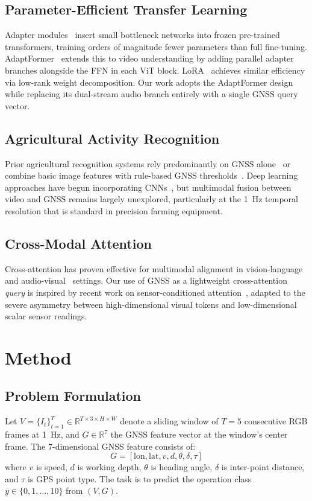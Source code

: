 \documentclass[10pt,twocolumn]{article}
\begin{document}
\subsection{Parameter-Efficient Transfer Learning}
Adapter modules~\cite{houlsby2019parameter} insert small bottleneck networks into frozen pre-trained transformers, training orders of magnitude fewer parameters than full fine-tuning. AdaptFormer~\cite{chen2022adaptformer} extends this to video understanding by adding parallel adapter branches alongside the FFN in each ViT block. LoRA~\cite{hu2021lora} achieves similar efficiency via low-rank weight decomposition. Our work adopts the AdaptFormer design while replacing its dual-stream audio branch entirely with a single GNSS query vector.

\subsection{Agricultural Activity Recognition}
Prior agricultural recognition systems rely predominantly on GNSS alone~\cite{zhang2010gnss} or combine basic image features with rule-based GNSS thresholds~\cite{strisciuglio2018detection}. Deep learning approaches have begun incorporating CNNs~\cite{koirala2019deep}, but multimodal fusion between video and GNSS remains largely unexplored, particularly at the 1~Hz temporal resolution that is standard in precision farming equipment.

\subsection{Cross-Modal Attention}
Cross-attention has proven effective for multimodal alignment in vision-language~\cite{radford2021clip} and audio-visual~\cite{morgado2021avid} settings. Our use of GNSS as a lightweight cross-attention \emph{query} is inspired by recent work on sensor-conditioned attention~\cite{liu2022bevfusion}, adapted to the severe asymmetry between high-dimensional visual tokens and low-dimensional scalar sensor readings.

\section{Method}

\subsection{Problem Formulation}
Let $V = \{I_t\}_{t=1}^{T} \in \mathbb{R}^{T \times 3 \times H \times W}$ denote a sliding window of $T=5$ consecutive RGB frames at 1~Hz, and $G \in \mathbb{R}^{7}$ the GNSS feature vector at the window's center frame. The 7-dimensional GNSS feature consists of:
\[
G = [\text{lon}, \text{lat}, v, d, \theta, \delta, \tau]
\]
where $v$ is speed, $d$ is working depth, $\theta$ is heading angle, $\delta$ is inter-point distance, and $\tau$ is GPS point type. The task is to predict the operation class $y \in \{0, 1, \ldots, 10\}$ from $(V, G)$.
\end{document}
